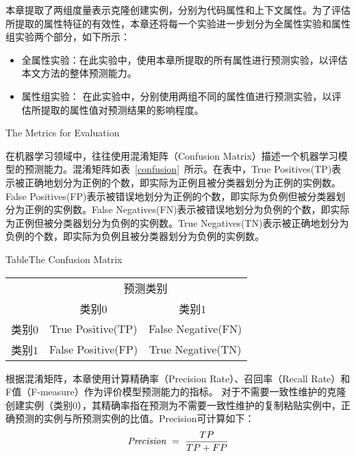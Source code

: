 本章提取了两组度量表示克隆创建实例，分别为代码属性和上下文属性。为了评估所提取的属性特征的有效性，本章还将每一个实验进一步划分为全属性实验和属性组实验两个部分，如下所示：
\begin{itemize}
\item
全属性实验：在此实验中，使用本章所提取的所有属性进行预测实验，以评估本文方法的整体预测能力。
\item
属性组实验：
在此实验中，分别使用两组不同的属性值进行预测实验，以评估所提取的属性值对预测结果的影响程度。
\end{itemize}

{The Metrics for Evaluation }
\label{ref-creatingmetrics}

在机器学习领域中，往往使用混淆矩阵（Confusion Matrix）描述一个机器学习模型的预测能力。混淆矩阵如表~\ref{confusion}~所示。在表中，True Positives(TP)表示被正确地划分为正例的个数，即实际为正例且被分类器划分为正例的实例数。False Positives(FP)表示被错误地划分为正例的个数，即实际为负例但被分类器划分为正例的实例数。False Negatives(FN)表示被错误地划分为负例的个数，即实际为正例但被分类器划分为负例的实例数。True Negatives(TN)表示被正确地划分为负例的个数，即实际为负例且被分类器划分为负例的实例数。　　​

\begin{table}[htbp]
{Table$\!$}{The Confusion Matrix}
\vspace{0.5em}
\centering
\wuhao
\begin{tabular}{ccc}
\toprule[1.5pt]
~\multirow{2}{*}{真实类别}& \multicolumn{2}{c}{预测类别} ~\\ 
 \cline{2-3}
~&{类别$0$} &{类别$1$}~\\
\midrule[1pt]
类别$0$&True Positive(TP)	&False Negative(FN)\\
类别$1$&False Positive(FP)	&True Negative(TN)\\
\bottomrule[1.5pt]
\end{tabular}
\end{table}

根据混淆矩阵，本章使用计算精确率（Precision Rate）、召回率（Recall Rate）和F值（F-measure）作为评价模型预测能力的指标。
对于不需要一致性维护的克隆创建实例（类别$0$），其精确率指在预测为不需要一致性维护的复制粘贴实例中，正确预测的实例与所预测实例的比值。Precision可计算如下：
\begin{equation} 
\mbox{\it Precision}~=~{\frac {TP}{TP+FP}}
 \end{equation}
 
